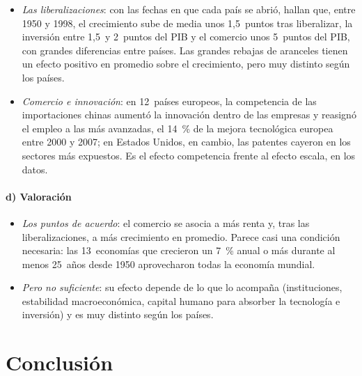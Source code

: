 \documentclass[11pt]{article}
\begin{document}
\begin{itemize}
\item \emph{Las liberalizaciones}: con las fechas en que cada país se abrió, \textcite{WacziargWelch2008Trade} hallan que, entre 1950 y 1998, el crecimiento sube de media unos 1,5~puntos tras liberalizar, la inversión entre 1,5~y 2~puntos del PIB y el comercio unos 5~puntos del PIB, con grandes diferencias entre países. Las grandes rebajas de aranceles tienen un efecto positivo en promedio sobre el crecimiento, pero muy distinto según los países\nocite{Irwin2025Does}.
\item \emph{Comercio e innovación}: en 12~países europeos, la competencia de las importaciones chinas aumentó la innovación dentro de las empresas y reasignó el empleo a las más avanzadas, el 14~\% de la mejora tecnológica europea entre 2000 y 2007\nocite{BloomDracaVanReenen2016Trade}; en Estados Unidos, en cambio, las patentes cayeron en los sectores más expuestos\nocite{AutorEtAl2020Foreign}. Es el efecto competencia frente al efecto escala, en los datos.
\end{itemize}

\paragraph{d) Valoración}

\begin{itemize}
\item \emph{Los puntos de acuerdo}: el comercio se asocia a más renta y, tras las liberalizaciones, a más crecimiento en promedio. Parece casi una condición necesaria: las 13~economías que crecieron un 7~\% anual o más durante al menos 25~años desde 1950 aprovecharon todas la economía mundial\nocite{GrowthCommission2008Growth}.
\item \emph{Pero no suficiente}: su efecto depende de lo que lo acompaña (instituciones, estabilidad macroeconómica, capital humano para absorber la tecnología e inversión) y es muy distinto según los países.
\end{itemize}

\section*{Conclusión}
\end{document}
